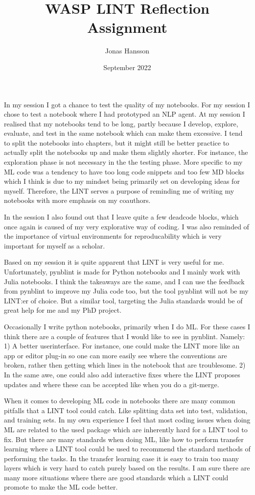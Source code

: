 \documentclass{article}
\title{\vspace{-3.0cm}WASP LINT Reflection Assignment}
\author{Jonas Hansson }
\date{September 2022}
\begin{document}
\maketitle

In my session I got a chance to test the quality of my notebooks. For my session I chose to test a notebook where I had prototyped an NLP agent. At my session I realised that my notebooks tend to be long, partly because I develop, explore, evaluate, and test in the same notebook which can make them excessive. I tend to split the notebooks into chapters, but it might still be better practice to actually split the notebooks up and make them slightly shorter. For instance, the exploration phase is not necessary in the the testing phase. More specific to my ML code was a tendency to have too long code snippets and too few MD blocks which I think is due to my mindset being primarily set on developing ideas for myself. Therefore, the LINT serves a purpose of reminding me of writing my notebooks with more emphasis on my coauthors.  

In the session I also found out that I leave quite a few deadcode blocks, which once again is caused of my very explorative way of coding. I was also reminded of the importance of virtual environments for reproducability which is very important for myself as a scholar. 

Based on my session it is quite apparent that LINT is very useful for me. Unfortunately, pynblint is made for Python notebooks and I mainly work with Julia notebooks. I think the takeaways are the same, and I can use the feedback from pynblint to improve my Julia code too, but the tool pynblint will not be my LINT:er of choice. But a similar tool, targeting the Julia standards would be of great help for me and my PhD project.

Occasionally I write python notebooks, primarily when I do ML. For these cases I think there are a couple of features that I would like to see in pynblint. Namely: 1) A better userinterface. For instance, one could make the LINT more like an app or editor plug-in so one can more easily see where the conventions are broken, rather then getting which lines in the notebook that are troublesome. 2) In the same awe, one could also add interactive fixes where the LINT proposes updates and where these can be accepted like when you do a git-merge. 

When it comes to developing ML code in notebooks there are many common pitfalls that a LINT tool could catch. Like splitting data set into test, validation, and training sets. In my own experience I feel that most coding issues when doing ML are related to the used package which are inherently hard for a LINT tool to fix. But there are many standards when doing ML, like how to perform transfer learning where a LINT tool  could be used to recommend the standard methods of performing the tasks. In the transfer learning case it is easy to train too many layers which is very hard to catch purely based on the results. I am sure there are many more situations where there are good standards which a LINT could promote to make the ML code better.  
\end{document}
